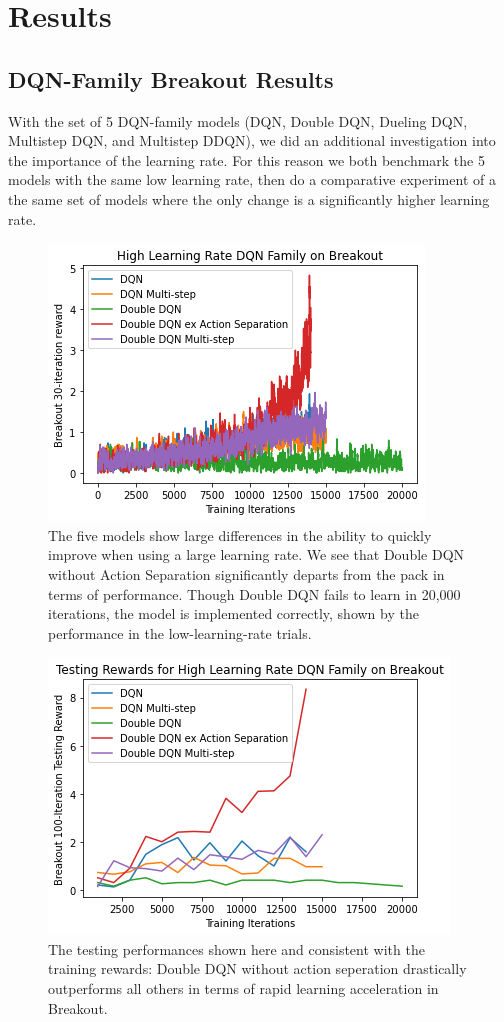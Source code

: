 \documentclass[conference]{IEEEtran}
\begin{document}
\section{Results} \label{results}

\subsection{DQN-Family Breakout Results}
With the set of 5 DQN-family models (DQN, Double DQN, Dueling DQN, Multistep DQN, and Multistep DDQN), we did an additional investigation into the importance of the learning rate. For this reason we both benchmark the 5 models with the same low learning rate, then do a comparative experiment of a the same set of models where the only change is a significantly higher learning rate.

\begin{figure}
\centerline{\includegraphics[scale=0.6]{DQNs_breakout_high_train.png}}
\caption{The five models show large differences in the ability to quickly improve when using a large learning rate. We see that Double DQN without Action Separation significantly departs from the pack in terms of performance. Though Double DQN fails to learn in 20,000 iterations, the model is implemented correctly, shown by the performance in the low-learning-rate trials.}
\end{figure}


\begin{figure}
\centerline{\includegraphics[scale=0.6]{DQNs_breakout_high.png}}
\caption{The testing performances shown here and consistent with the training rewards: Double DQN without action seperation drastically outperforms all others in terms of rapid learning acceleration in Breakout.}
\end{figure}
\end{document}
